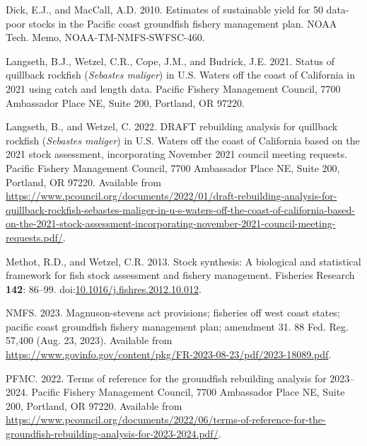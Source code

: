 \documentclass[11pt,
  letterpaper,
]{article}
\newlength{\cslhangindent}
\newenvironment{CSLReferences}[2] %
 {%
  \setlength{\parindent}{0pt}
  \ifodd #1 \everypar{\setlength{\hangindent}{\cslhangindent}}\ignorespaces\fi
  \ifnum #2 > 0
  \setlength{\parskip}{#2\baselineskip}
  \fi
 }%
 {}
\begin{document}
\hypertarget{refs}{}
\begin{CSLReferences}{1}{0}
\leavevmode{}%
Dick, E.J., and MacCall, A.D. 2010. Estimates of sustainable yield for 50 data-poor stocks in the {P}acific coast groundfish fishery management plan. NOAA Tech. Memo, NOAA-TM-NMFS-SWFSC-460.

\leavevmode{}%
Langseth, B.J., Wetzel, C.R., Cope, J.M., and Budrick, J.E. 2021. Status of quillback rockfish (\emph{{Sebastes} maliger}) in {U}.{S}. Waters off the coast of {C}alifornia in 2021 using catch and length data. Pacific Fishery Management Council, 7700 Ambassador Place NE, Suite 200, Portland, OR 97220.

\leavevmode{}%
Langseth, B., and Wetzel, C. 2022. DRAFT rebuilding analysis for quillback rockfish (\emph{{S}ebastes maliger}) in {U}.{S}. Waters off the coast of {C}alifornia based on the 2021 stock assessment, incorporating {N}ovember 2021 council meeting requests. Pacific Fishery Management Council, 7700 Ambassador Place NE, Suite 200, Portland, OR 97220. Available from \url{https://www.pcouncil.org/documents/2022/01/draft-rebuilding-analysis-for-quillback-rockfish-sebastes-maliger-in-u-s-waters-off-the-coast-of-california-based-on-the-2021-stock-assessment-incorporating-november-2021-council-meeting-requests.pdf/}.

\leavevmode{}%
Methot, R.D., and Wetzel, C.R. 2013. Stock synthesis: A biological and statistical framework for fish stock assessment and fishery management. Fisheries Research \textbf{142}: 86--99. doi:\href{https://doi.org/10.1016/j.fishres.2012.10.012}{10.1016/j.fishres.2012.10.012}.

\leavevmode{}%
NMFS. 2023. Magnuson-stevens act provisions; fisheries off west coast states; pacific coast groundfish fishery management plan; amendment 31. 88 Fed. Reg. 57,400 (Aug. 23, 2023). Available from \url{https://www.govinfo.gov/content/pkg/FR-2023-08-23/pdf/2023-18089.pdf}.

\leavevmode{}%
PFMC. 2022. Terms of reference for the groundfish rebuilding analysis for 2023--2024. Pacific Fishery Management Council, 7700 Ambassador Place NE, Suite 200, Portland, OR 97220. Available from \url{https://www.pcouncil.org/documents/2022/06/terms-of-reference-for-the-groundfish-rebuilding-analysis-for-2023-2024.pdf/}.

\end{CSLReferences}
\end{document}
